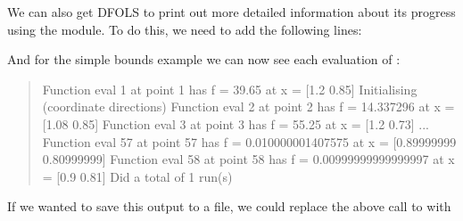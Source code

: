 \documentclass[letterpaper,10pt,english]{sphinxmanual}
\begin{document}
We can also get DFO\sphinxhyphen{}LS to print out more detailed information about its progress using the  module. To do this, we need to add the following lines:
\begin{quote}

\begin{sphinxVerbatim}[commandchars=\\\{\}]
 
 

\end{sphinxVerbatim}
\end{quote}

And for the simple bounds example we can now see each evaluation of :
\begin{quote}

\begin{sphinxVerbatim}[commandchars=\\\{\}]
Function eval 1 at point 1 has f = 39.65 at x = [\PYGZhy{}1.2   0.85]
Initialising (coordinate directions)
Function eval 2 at point 2 has f = 14.337296 at x = [\PYGZhy{}1.08  0.85]
Function eval 3 at point 3 has f = 55.25 at x = [\PYGZhy{}1.2   0.73]
...
Function eval 57 at point 57 has f = 0.010000001407575 at x = [0.89999999 0.80999999]
Function eval 58 at point 58 has f = 0.00999999999999997 at x = [0.9  0.81]
Did a total of 1 run(s)
\end{sphinxVerbatim}
\end{quote}

If we wanted to save this output to a file, we could replace the above call to  with
\begin{quote}

\begin{sphinxVerbatim}[commandchars=\\\{\}]
 
                     
\end{sphinxVerbatim}
\end{quote}
\end{document}
